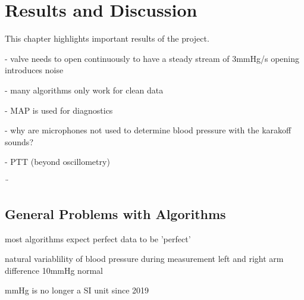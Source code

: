 \chapter{Results and Discussion}\label{cp:res}


This chapter highlights important results of the project.


- valve needs to open continuously to have a steady stream of 3mmHg/s
  opening introduces noise

- many algorithms only work for clean data

- MAP is used for diagnostics

- why are microphones not used to determine blood pressure with the karakoff sounds?

- PTT (beyond oscillometry)

¨
\section{General Problems with Algorithms}
most algorithms expect perfect data to be 'perfect'

natural variablility of blood pressure during measurement
left and right arm difference 10mmHg normal


mmHg is no longer a SI unit since 2019
